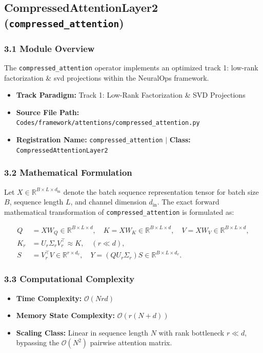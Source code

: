 \subsection{CompressedAttentionLayer2 (\texttt{compressed\_attention})}
\label{sec:app_module_compressed_attention}

\subsubsection*{3.1 Module Overview}
The \texttt{compressed\_attention} operator implements an optimized track 1: low-rank factorization \& svd projections within the NeuralOps framework.
\begin{itemize}
    \item \textbf{Track Paradigm:} Track 1: Low-Rank Factorization \& SVD Projections
    \item \textbf{Source File Path:} \texttt{Codes/framework/attentions/compressed\_attention.py}
    \item \textbf{Registration Name:} \texttt{compressed\_attention} $\mid$ \textbf{Class:} \texttt{CompressedAttentionLayer2}
\end{itemize}

\subsubsection*{3.2 Mathematical Formulation}
Let $X \in \mathbb{R}^{B \times L \times d_{\text{in}}}$ denote the batch sequence representation tensor for batch size $B$, sequence length $L$, and channel dimension $d_{\text{in}}$. The exact forward mathematical transformation of \texttt{compressed\_attention} is formulated as:

\begin{align}
Q &= X W_Q \in \mathbb{R}^{B \times L \times d}, \quad K = X W_K \in \mathbb{R}^{B \times L \times d}, \quad V = X W_V \in \mathbb{R}^{B \times L \times d}, \\
K_r &= U_r \Sigma_r V_r^\top \approx K, \quad (r \ll d), \\
S &= V_r^\top V \in \mathbb{R}^{r \times d_v}, \quad Y = (Q U_r \Sigma_r) S \in \mathbb{R}^{B \times L \times d_v}.
\end{align}


\subsubsection*{3.3 Computational Complexity}
\begin{itemize}
    \item \textbf{Time Complexity:} $\mathcal{O}(N r d)$
    \item \textbf{Memory State Complexity:} $\mathcal{O}(r(N + d))$
    \item \textbf{Scaling Class:} Linear in sequence length $N$ with rank bottleneck $r \ll d$, bypassing the $\mathcal{O}(N^2)$ pairwise attention matrix.
\end{itemize}

